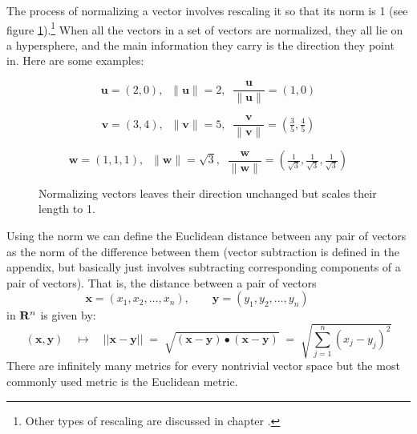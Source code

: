 The process of normalizing a vector involves rescaling it so that its norm is 1 (see figure \ref{normalizeVectors}).\footnote{Other types of rescaling are discussed in chapter .} When all the vectors in a set of vectors are normalized, they all lie on a hypersphere, and the main information they carry is the direction they point in. Here are some examples:
\begin{description}
\item $$\textbf{u} = (2,0), \;\; \|\textbf{u}\| = 2, \;\; 
\frac{\textbf{u}}{\|\textbf{u}\|} = (1,0)$$
\item $$\textbf{v} = (3,4), \;\; \|\textbf{v}\| = 5, \;\; 
\frac{\textbf{v}}{\|\textbf{v}\|} = \left(\tfrac{3}{5}, \tfrac{4}{5}\right)$$
\item $$\textbf{w} = (1,1,1), \;\; \|\textbf{w}\| = \sqrt{3}, \;\; 
\frac{\textbf{w}}{\|\textbf{w}\|} = \left(\tfrac{1}{\sqrt{3}}, \tfrac{1}{\sqrt{3}}, \tfrac{1}{\sqrt{3}}\right)$$
\end{description}

\begin{figure}[h]
\centering
{}
\caption[Scott Hotton.]{Normalizing vectors leaves their direction unchanged but scales their length to 1.}
\label{normalizeVectors}
\end{figure}

Using the norm we can define the Euclidean distance between any pair of vectors as the norm of the difference between them (vector subtraction is defined in the appendix, but basically just involves subtracting corresponding components of a pair of vectors). That is, the distance between a pair of vectors
\begin{equation*}
\mathbf{x} = (x_1, x_2, \ldots, x_n), \qquad
\mathbf{y} = (y_1, y_2, \ldots, y_n) \qquad
\end{equation*}
in ${\bf R}^n$ is given by:
\begin{equation*}
\left(\mathbf{x}, \mathbf{y}\right) \quad \mapsto \quad
|| \mathbf{x} - \mathbf{y} || \; = \; 
\sqrt{ (\mathbf{x} - \mathbf{y}) \bullet (\mathbf{x} - \mathbf{y}) }
\; = \;  \sqrt{ \sum_{j=1}^n (x_j - y_j)^2 }
\end{equation*}
There are infinitely many metrics for every nontrivial vector space but the 
most commonly used metric is the Euclidean metric.

